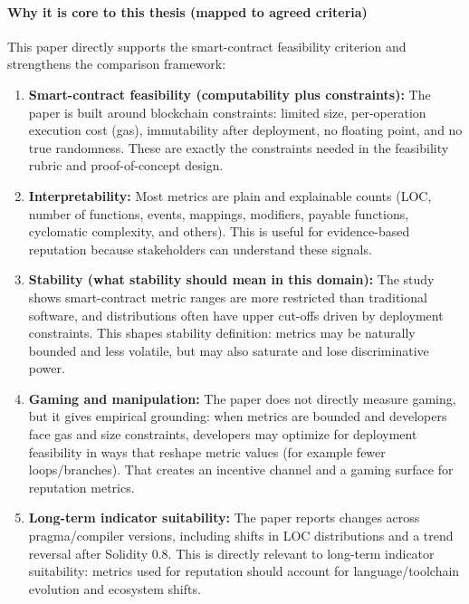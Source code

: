 \documentclass[11pt,a4paper]{article}
\begin{document}
\paragraph{Why it is core to this thesis (mapped to agreed criteria)}
This paper directly supports the smart-contract feasibility criterion and strengthens the comparison framework:
\begin{enumerate}[leftmargin=*]
  \item \textbf{Smart-contract feasibility (computability plus constraints):}
  The paper is built around blockchain constraints: limited size, per-operation execution cost (gas), immutability after deployment, no floating point, and no true randomness. These are exactly the constraints needed in the feasibility rubric and proof-of-concept design.
  \item \textbf{Interpretability:}
  Most metrics are plain and explainable counts (LOC, number of functions, events, mappings, modifiers, payable functions, cyclomatic complexity, and others). This is useful for evidence-based reputation because stakeholders can understand these signals.
  \item \textbf{Stability (what stability should mean in this domain):}
  The study shows smart-contract metric ranges are more restricted than traditional software, and distributions often have upper cut-offs driven by deployment constraints. This shapes stability definition: metrics may be naturally bounded and less volatile, but may also saturate and lose discriminative power.
  \item \textbf{Gaming and manipulation:}
  The paper does not directly measure gaming, but it gives empirical grounding: when metrics are bounded and developers face gas and size constraints, developers may optimize for deployment feasibility in ways that reshape metric values (for example fewer loops/branches). That creates an incentive channel and a gaming surface for reputation metrics.
  \item \textbf{Long-term indicator suitability:}
  The paper reports changes across pragma/compiler versions, including shifts in LOC distributions and a trend reversal after Solidity 0.8. This is directly relevant to long-term indicator suitability: metrics used for reputation should account for language/toolchain evolution and ecosystem shifts.
\end{enumerate}
\end{document}
